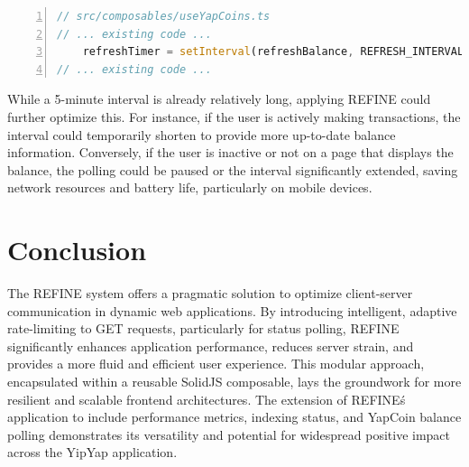 \documentclass[10pt]{article}
\begin{document}
\begin{lstlisting}[language=TypeScript, basicstyle=\small\ttfamily, numbers=left, xleftmargin=1em, xrightmargin=1em, breaklines=true]
// src/composables/useYapCoins.ts
// ... existing code ...
    refreshTimer = setInterval(refreshBalance, REFRESH_INTERVAL);
// ... existing code ...
\end{lstlisting}

While a 5-minute interval is already relatively long, applying REFINE could further optimize this. For instance, if the user is actively making transactions, the interval could temporarily shorten to provide more up-to-date balance information. Conversely, if the user is inactive or not on a page that displays the balance, the polling could be paused or the interval significantly extended, saving network resources and battery life, particularly on mobile devices.

\section{Conclusion}
The REFINE system offers a pragmatic solution to optimize client-server communication in dynamic web applications. By introducing intelligent, adaptive rate-limiting to GET requests, particularly for status polling, REFINE significantly enhances application performance, reduces server strain, and provides a more fluid and efficient user experience. This modular approach, encapsulated within a reusable SolidJS composable, lays the groundwork for more resilient and scalable frontend architectures. The extension of REFINE\'s application to include performance metrics, indexing status, and YapCoin balance polling demonstrates its versatility and potential for widespread positive impact across the YipYap application.
\end{document}
